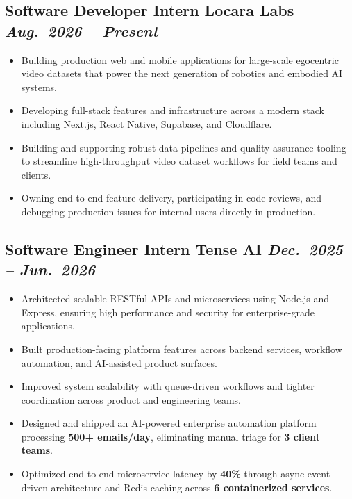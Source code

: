 \documentclass[letterpaper,10pt]{article}
\begin{document}
\vspace{4pt}
\subsection{Software Developer Intern \textbar{} Locara Labs \hfill \normalfont\textit{Aug.\ 2026 -- Present}}

\begin{itemize}
  \item Building production web and mobile applications for large-scale egocentric video datasets that power the next generation of robotics and embodied AI systems.
  \item Developing full-stack features and infrastructure across a modern stack including Next.js, React Native, Supabase, and Cloudflare.
  \item Building and supporting robust data pipelines and quality-assurance tooling to streamline high-throughput video dataset workflows for field teams and clients.
  \item Owning end-to-end feature delivery, participating in code reviews, and debugging production issues for internal users directly in production.
\end{itemize}

\vspace{4pt}
\subsection{Software Engineer Intern \textbar{} Tense AI \hfill \normalfont\textit{Dec.\ 2025 -- Jun.\ 2026}}

\begin{itemize}
  \item Architected scalable RESTful APIs and microservices using Node.js and Express, ensuring high performance and security for enterprise-grade applications.
  \item Built production-facing platform features across backend services, workflow automation, and AI-assisted product surfaces.
  \item Improved system scalability with queue-driven workflows and tighter coordination across product and engineering teams.
  \item Designed and shipped an AI-powered enterprise automation platform processing \textbf{500+ emails/day}, eliminating manual triage for \textbf{3 client teams}.
  \item Optimized end-to-end microservice latency by \textbf{40\%} through async event-driven architecture and Redis caching across \textbf{6 containerized services}.
\end{itemize}
\end{document}
